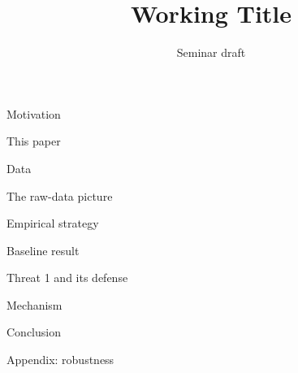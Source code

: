 \documentclass[aspectratio=169,11pt]{beamer}
\title{Working Title}
\author{}
\institute{}
\date{Seminar draft}
\begin{document}
\begin{frame}\titlepage\end{frame}

\begin{frame}{Motivation}
\end{frame}

\begin{frame}{This paper}
\end{frame}

\begin{frame}{Data}
\end{frame}

\begin{frame}{The raw-data picture}
\end{frame}

\begin{frame}{Empirical strategy}
\end{frame}

\begin{frame}{Baseline result}
\end{frame}

\begin{frame}{Threat 1 and its defense}
\end{frame}

\begin{frame}{Mechanism}
\end{frame}

\begin{frame}{Conclusion}
\end{frame}

\appendix
\begin{frame}{Appendix: robustness}
\end{frame}
\end{document}
